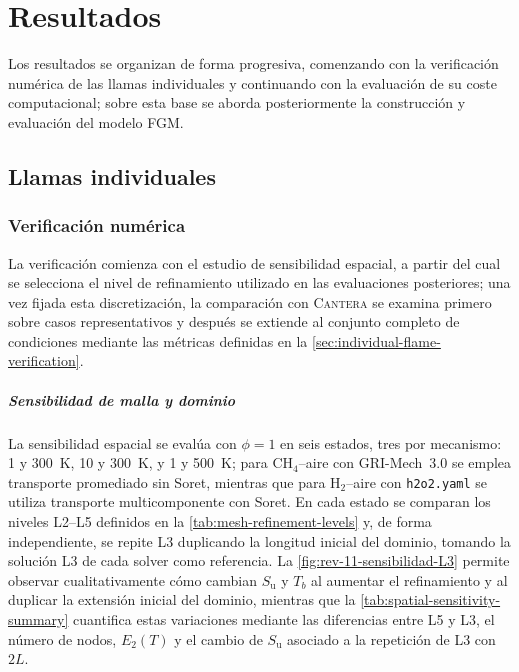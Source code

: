 \documentclass[12pt,a4paper,twoside,openany]{book}
\newcommand{\Su}{S_{\mathrm{u}}}
\newcommand{\Cantera}{\textsc{Cantera}\xspace}
\begin{document}
\hypersetup{pageanchor=false}

\chapter{Resultados}
\label{chap:resultados}

Los resultados se organizan de forma progresiva, comenzando con la verificación
numérica de las llamas individuales y continuando con la evaluación de su coste
computacional; sobre esta base se aborda posteriormente la construcción y
evaluación del modelo FGM.

\section{Llamas individuales}
\label{sec:individual-flames-results}

\subsection{Verificación numérica}
\label{sec:numerical-verification}

La verificación comienza con el estudio de sensibilidad espacial, a partir del
cual se selecciona el nivel de refinamiento utilizado en las evaluaciones
posteriores; una vez fijada esta discretización, la comparación con
\Cantera{} se examina primero sobre casos representativos y después se extiende
al conjunto completo de condiciones mediante las métricas definidas en la
\cref{sec:individual-flame-verification}.

\paragraph{Sensibilidad de malla y dominio}

La sensibilidad espacial se evalúa con \(\phi=1\) en seis estados, tres por
mecanismo: \SI{1}{\atmosphere} y \SI{300}{\kelvin},
\SI{10}{\atmosphere} y \SI{300}{\kelvin}, y
\SI{1}{\atmosphere} y \SI{500}{\kelvin}; para CH$_4$--aire con
GRI-Mech~3.0 se emplea transporte promediado sin Soret, mientras que para
H$_2$--aire con \texttt{h2o2.yaml} se utiliza transporte multicomponente con
Soret. En cada estado se comparan los niveles L2--L5 definidos en la
\cref{tab:mesh-refinement-levels} y, de forma independiente, se repite L3
duplicando la longitud inicial del dominio, tomando la solución L3 de cada
solver como referencia. La \cref{fig:rev-11-sensibilidad-L3} permite observar
cualitativamente cómo cambian \(\Su\) y \(T_b\) al aumentar el refinamiento y
al duplicar la extensión inicial del dominio, mientras que la
\cref{tab:spatial-sensitivity-summary} cuantifica estas variaciones mediante
las diferencias entre L5 y L3, el número de nodos, \(E_2(T)\) y el cambio de
\(\Su\) asociado a la repetición de L3 con \(2L\).
\end{document}
